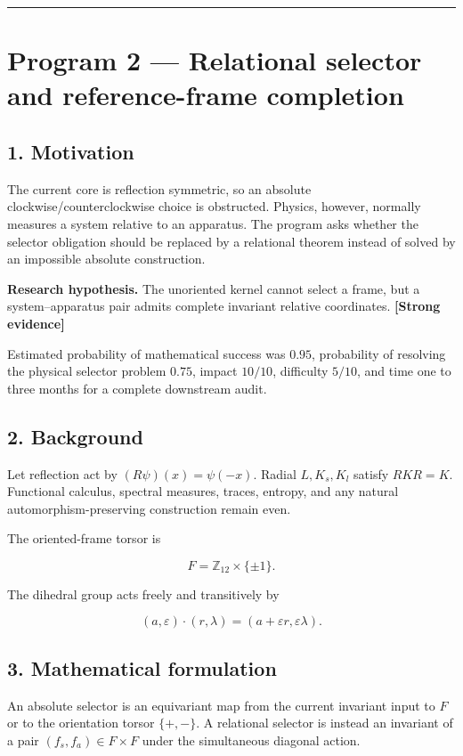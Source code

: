 \documentclass[11pt,a4paper,openany]{report}
\newcommand{\statusStrong}{\textcolor{finblue}{[Strong evidence]}}
\begin{document}
\par\medskip\hrule\medskip

\chapter{Program 2 — Relational selector and reference-frame completion}

\section{1. Motivation}

The current core is reflection symmetric, so an absolute clockwise/\allowbreak{}counterclockwise choice is obstructed. Physics, however, normally measures a system relative to an apparatus. The program asks whether the selector obligation should be replaced by a relational theorem instead of solved by an impossible absolute construction.

\textbf{Research hypothesis.} The unoriented kernel cannot select a frame, but a system–apparatus pair admits complete invariant relative coordinates. \textbf{\statusStrong{}}

Estimated probability of mathematical success was \(0.95\), probability of resolving the physical selector problem \(0.75\), impact \(10/10\), difficulty \(5/10\), and time one to three months for a complete downstream audit.

\section{2. Background}

Let reflection act by \((R\psi)(x)=\psi(-x)\). Radial \(L,K_s,K_l\) satisfy \(RKR=K\). Functional calculus, spectral measures, traces, entropy, and any natural automorphism-preserving construction remain even.

The oriented-frame torsor is

\[
F=\mathbb Z_{12}\times\{\pm1\}.
\]

The dihedral group acts freely and transitively by

\[
(a,\varepsilon)\cdot(r,\lambda)
=(a+\varepsilon r,\varepsilon\lambda).
\]

\section{3. Mathematical formulation}

An absolute selector is an equivariant map from the current invariant input to \(F\) or to the orientation torsor \(\{+,-\}\). A relational selector is instead an invariant of a pair \((f_s,f_a)\in F\times F\) under the simultaneous diagonal action.
\end{document}
